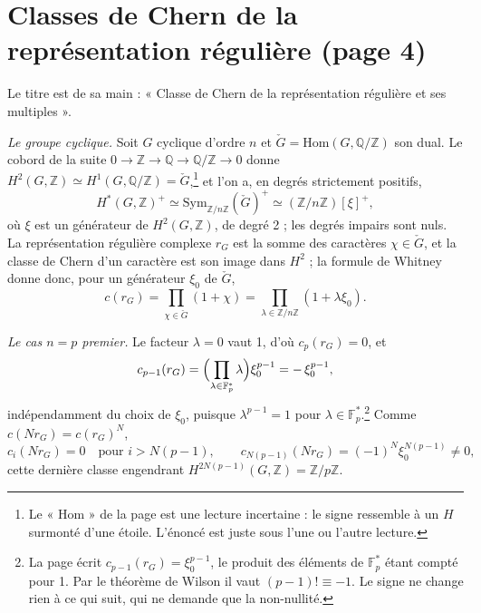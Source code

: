 \documentclass[11pt,a4paper]{article}
\begin{document}
\section*{Classes de Chern de la représentation régulière (page 4)}

Le titre est de sa main : « Classe de Chern de la représentation régulière et
ses multiples ».

\emph{Le groupe cyclique.} Soit $G$ cyclique d'ordre $n$ et $\check{G} =
\mathrm{Hom}(G, \mathbb{Q}/\mathbb{Z})$ son dual. Le cobord de la suite
$0 \to \mathbb{Z} \to \mathbb{Q} \to \mathbb{Q}/\mathbb{Z} \to 0$ donne
$H^{2}(G,\mathbb{Z}) \simeq H^{1}(G,\mathbb{Q}/\mathbb{Z}) =
\check{G}$,\footnote{Le « $\mathrm{Hom}$ » de la page est une lecture
incertaine : le signe ressemble à un $H$ surmonté d'une étoile. L'énoncé est
juste sous l'une ou l'autre lecture.} et l'on a, en degrés strictement
positifs,
\[
  H^{*}(G,\mathbb{Z})^{+} \simeq \mathrm{Sym}_{\mathbb{Z}/n\mathbb{Z}}(\check{G})^{+}
  \simeq (\mathbb{Z}/n\mathbb{Z})[\xi]^{+},
\]
où $\xi$ est un générateur de $H^{2}(G,\mathbb{Z})$, de degré 2 ; les degrés
impairs sont nuls. La représentation régulière complexe $r_{G}$ est la somme
des caractères $\chi \in \check{G}$, et la classe de Chern d'un caractère est
son image dans $H^{2}$ ; la formule de Whitney donne donc, pour un générateur
$\xi_{0}$ de $\check{G}$,
\[
  c(r_{G}) = \prod_{\chi \in \check{G}} (1 + \chi)
  = \prod_{\lambda \in \mathbb{Z}/n\mathbb{Z}} (1 + \lambda \xi_{0}) .
\]

\emph{Le cas $n = p$ premier.} Le facteur $\lambda = 0$ vaut 1, d'où
$c_{p}(r_{G}) = 0$, et
\[
  c_{p-1}(r_{G}) = \Bigl(\prod_{\lambda \in \mathbb{F}_{p}^{*}} \lambda\Bigr)
  \xi_{0}^{p-1} = -\,\xi_{0}^{p-1},
\]
indépendamment du choix de $\xi_{0}$, puisque $\lambda^{p-1} = 1$ pour
$\lambda \in \mathbb{F}_{p}^{*}$.\footnote{La page écrit $c_{p-1}(r_{G}) =
\xi_{0}^{p-1}$, le produit des éléments de $\mathbb{F}_{p}^{*}$ étant compté
pour 1. Par le théorème de Wilson il vaut $(p-1)! \equiv -1$. Le signe ne
change rien à ce qui suit, qui ne demande que la non-nullité.} Comme $c(N
r_{G}) = c(r_{G})^{N}$,
\[
  c_{i}(N r_{G}) = 0 \quad \text{pour } i > N(p-1), \qquad
  c_{N(p-1)}(N r_{G}) = (-1)^{N} \xi_{0}^{N(p-1)} \neq 0 ,
\]
cette dernière classe engendrant $H^{2N(p-1)}(G,\mathbb{Z}) =
\mathbb{Z}/p\mathbb{Z}$.
\end{document}
